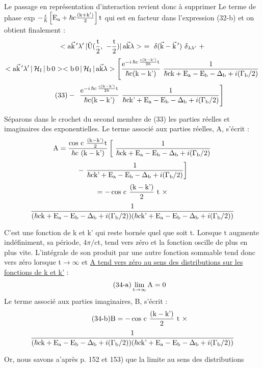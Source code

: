 Le passage en représentation d'interaction revient donc à supprimer Le terme
de phase exp $-\frac{i}{\hbar}\left[\text{E}_{\text{a}}+\hbar\text{c}\frac{\text{(k}+\text{k}')}{2}\right]\text{t}$ 
qui est en facteur dans l'expression (32-b)
et on obtient finalement :
\[
<\mt{a}\vec{\mt{k}}\,'\lambda'\,|\tilde{\mt{U}}(\frac{\mt{t}}{2},\ -\frac{\mt{t}}{2})|\,\mt{a}\vec{\mt{k}}\lambda>\ =
\ \delta(\vec{\mt{k}}-\vec{\mt{k}}\,')\ \delta_{\lambda\lambda'}\ +
\]
\[
<\mt{a}\vec{\mt{k}}\,'\lambda'\,|\,\mc{H}_\mt{I}\,|\,\mt{b}\,0 >
<\mt{b}\,0\,|\,\mc{H}_\mt{I}\,|\,\mt{a}\vec{\mt{k}}\lambda>\left[
\frac{\mt{e}^{-i\,\hbar\mt{c}\,\frac{\mt{c(k}-\mt{k')}}{2\hbar}\mt{t}}}{\hbar\mt{c(k}-\mt{k')}}
\ \frac{1}{\hbar\mt{ck}+\mt{E}_\mt{a}-\mt{E}_\mt{b}-\Delta_\mt{b}+i(\Gamma_\mt{b}/2)}
\right .
\]
\[
\tag{33}-\ \left.
\frac{\mt{e}^{-i\,\hbar\mt{c}\,\frac{\mt{c(k}-\mt{k')}}{2\hbar}\mt{t}}}{\hbar\mt{c(k}-\mt{k')}}
\ \frac{1}{\hbar\mt{ck'}+\mt{E}_\mt{a}-\mt{E}_\mt{b}-\Delta_\mt{b}+i(\Gamma_\mt{b}/2)}
\right]
\]

Séparons dans le crochet du second membre de (33) les parties
réelles et imaginaires des exponentielles. Le terme associé aux parties réelles,
A, s'écrit :
\[
\mt{A}=\frac{\mt{cos c }\frac{\mt{(k}-\mt{k')}}{2}\mt{t}}{\hbar\mt{c (k}-\mt{k')}}
\left[\ \frac{1}{\hbar\mt{ck}+\mt{E}_\mt{a}-\mt{E}_\mt{b}-\Delta_\mt{b}+i(\Gamma_\mt{b}/2)}\right.
\]
\[
\left.-\ \frac{1}{\hbar\mt{ck'}+\mt{E}_\mt{a}-\mt{E}_\mt{b}-\Delta_\mt{b}+i(\Gamma_\mt{b}/2)}\right]
\]
\[
=-\,\text{cos c }\frac{\text{(k}-\text{k')}}{2}\text{ t }\times
\]
\[
\frac{1}{(\hbar\text{ck}+\text{E}_{\text{a}}-\text{E}_{\text{b}}-\Delta_{\text{b}}+i(\Gamma_{\text{b}}/2))
(\hbar\text{ck'}+\text{E}_{\text{a}}-\text{E}_{\text{b}}-\Delta_{\text{b}}+i(\Gamma_{\text{b}}/2))}
\]


C'est une fonction de k et k' qui reste bornée quel que soit t.
Lorsque t augmente indéfiniment, sa période, $4\pi/$ct, tend vers zéro et la fonction oscille de plus en plus vite. L'intégrale de son produit par une autre
fonction sommable tend donc vers zéro lorsque t$\to\infty$ et \ul{A tend vers zéro au
sens des distributions sur les fonctions de k et k'} :
\[
\tag{34-a}\lim_{\text{t}\to\infty}\text{A}=0
\]
Le terme associé aux parties imaginaires, B, s'écrit :
\[
\tag{34-b}\text{B}=-\,\text{cos c }\frac{\text{(k}-\text{k')}}{2}\text{ t }\times
\]
\[
\frac{1}{(\hbar\text{ck}+\text{E}_{\text{a}}-\text{E}_{\text{b}}-\Delta_{\text{b}}+i(\Gamma_{\text{b}}/2))
(\hbar\text{ck'}+\text{E}_{\text{a}}-\text{E}_{\text{b}}-\Delta_{\text{b}}+i(\Gamma_{\text{b}}/2))}
\]

Or, nous savons a'après p. 152 et 153) que la limite au sens des distributions

